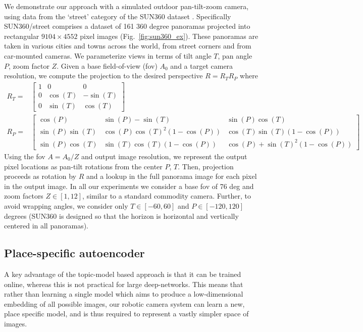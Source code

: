 We demonstrate our approach with a simulated outdoor pan-tilt-zoom camera, using data from the `street' category of the SUN360 dataset \citep{SUN360}. Specifically SUN360/street comprises a dataset of 161 360 degree panoramas projected into rectangular $9104 \times 4552$ pixel images (Fig.~\ref{fig:sun360_ex}). These panoramas are taken in various cities and towns across the world, from street corners and from car-mounted cameras. We parameterize views in terms of tilt angle $T$, pan angle $P$, zoom factor $Z$. Given a base field-of-view (fov) $A_0$ and a target camera resolution, we compute the projection to the desired perspective $R = R_TR_P$ where
\begin{equation}
\begin{split}
R_T =& 
\begin{bmatrix}
1 & 0 & 0\\
0 & \cos(T) & -\sin(T)\\
0 & \sin(T) & \cos(T)
\end{bmatrix}\\
R_P =&  
\begin{bmatrix}
\cos(P)        & \sin(P) - \sin(T)            & \sin(P)\cos(T)\\
\sin(P)\sin(T) & \cos(P)\cos(T)^2(1 -\cos(P)) & \cos(T)\sin(T)(1-\cos(P))\\
\sin(P)\cos(T) & \sin(T)\cos(T)(1-\cos(P))    & \cos(P)+\sin(T)^2(1-\cos(P))
\end{bmatrix}
\end{split}
\end{equation}
Using the fov $A = A_0/Z$ and output image resolution, we represent the output pixel locations as pan-tilt rotations from the center $P$, $T$. Then, projection proceeds as rotation by $R$ and a lookup in the full panorama image for each pixel in the output image. In all our experiments we consider a base fov of 76 deg and zoom factors $Z \in [1, 12]$, similar to a standard commodity camera. Further, to avoid wrapping angles, we consider only $T \in [-60, 60]$ and $P \in [-120, 120]$ degrees (SUN360 is designed so that the horizon is horizontal and vertically centered in all panoramas).

\subsection{Place-specific autoencoder}

A key advantage of the topic-model based approach is that it can be trained online, whereas this is not practical for large deep-networks. This means that rather than learning a single model which aims to produce a low-dimensional embedding of all possible images, our robotic camera system can learn a new, place specific model, and is thus required to represent a vastly simpler space of images.

